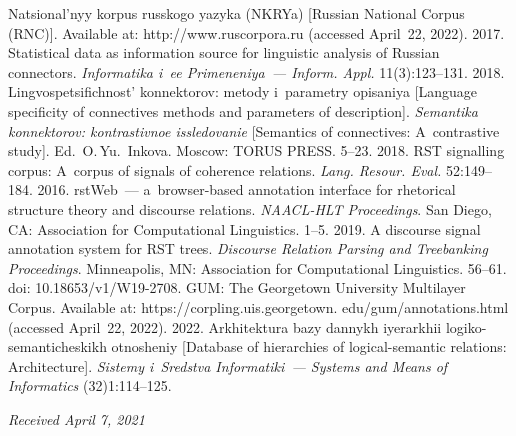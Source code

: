 \begin{multicols}{2}
{{\begin{thebibliography}{99}
Natsional'nyy korpus russkogo yazyka (NKRYa) [Russian National Corpus (RNC)]. Available at: {\sf 
http://www.ruscorpora.ru} (accessed April~22, 2022).
 2017. Statistical data as information source for 
linguistic analysis of Russian connectors. \textit{Informatika i~ee Primeneniya~--- 
Inform. Appl.} 11(3):123--131.
 2018. Lingvospetsifichnost' konnektorov: metody i~parametry 
opisaniya [Language specificity of connectives methods and parameters of description]. 
\textit{Semantika konnektorov: kontrastivnoe issledovanie} [Semantics of connectives: 
A~contrastive study]. Ed.\ O.\,Yu.~Inkova. Moscow: TORUS PRESS. 5--23.
 2018. RST signalling corpus: A~corpus of signals of 
coherence relations. \textit{Lang. Resour.  Eval.} 52:149--184.
 2016. rstWeb~--- a~browser-based annotation interface for rhetorical 
structure theory and discourse relations. \textit{NAACL-HLT Proceedings}. San Diego, CA: 
Association for Computational Linguistics. 1--5.
 2019. A discourse signal annotation system 
for RST trees. \textit{Discourse Relation Parsing and Treebanking Proceedings}. 
Minneapolis, MN: Association for Computational Linguistics. 56--61.
doi: 10.18653/v1/W19-2708. 
GUM: The Georgetown University Multilayer Corpus. Available at: {\sf 
https://corpling.uis.georgetown. edu/gum/annotations.html} (accessed April~22, 2022).
 2022. Arkhitektura bazy 
dannykh iyerarkhii logiko-semanticheskikh otnosheniy [Database of hierarchies of 
logical-semantic relations: Architecture]. \textit{Sis\-te\-my i~Sred\-st\-va Informatiki~--- 
Systems and Means of Informatics} (32)1:114--125.

\end{thebibliography}

 }
 }
 

\end{multicols}

\vspace*{-8pt}

\hfill{\small\textit{Received April 7, 2021}}

\vspace*{-20pt}

\Contr

\vspace*{-6pt}


